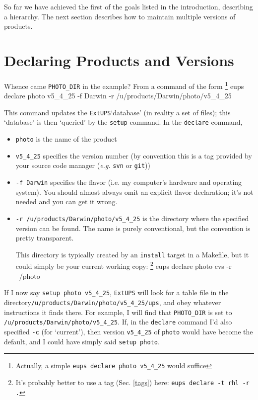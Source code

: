 \documentclass{article}
\newcommand{\code}[1]{\texttt{#1}}
\newcommand{\eups}{\code{ExtUPS}\xspace}
\let\overbatim=\verbatim
\let\oendverbatim=\endverbatim
\renewenvironment{verbatim}
{\center\minipage{16cm}\overbatim}
{\oendverbatim\endminipage\endcenter}
\begin{document}
So far we have achieved the first of the goals listed in the introduction,
describing a hierarchy.   The next section describes how to maintain
multiple versions of products.

\section{Declaring Products and Versions}

Whence came \code{PHOTO\_DIR} in the example? From a command of the form
\footnote{Actually, a simple \code{eups declare photo v5\_4\_25} would suffice}
\begin{verbatim}
eups declare photo v5_4_25 -f Darwin -r /u/products/Darwin/photo/v5_4_25
\end{verbatim}

This command updates the \eups `database' (in reality a set of files);
this `database' is then `queried' by the \code{setup} command. In
the \code{declare} command,
\begin{itemize}
  \item
    \code{photo} is the name of the product

  \item
    \code{v5\_4\_25} specifies the version number (by convention this
    is a tag provided by your source code manager (\textit{e.g.} \code{svn} or \code{git}))

  \item
    \code{-f Darwin} specifies the flavor (i.e. my computer's hardware and
    operating system).  You should almost always omit an explicit flavor declaration;
    it's not needed and you can get it wrong.

  \item
    \code{-r /u/products/Darwin/photo/v5\_4\_25} is the directory where
    the specified version can be found. The name is purely conventional,
    but the convention is pretty transparent.

    This directory is typically created by an \code{install} target
    in a Makefile, but it could simply be your current working
    copy: \footnote{It's probably better to use a tag (Sec. \ref{tags}) here: \code{eups declare -t rhl -r .}}
    \vspace{-7mm}
\begin{verbatim}
       eups declare photo cvs -r ~/photo
\end{verbatim}
\end{itemize}

If I now say \code{setup photo v5\_4\_25}, \eups will look for
a table file in the directory\hfil\break \code{/u/products/Darwin/photo/v5\_4\_25/ups},
and obey whatever instructions it finds there.  For example,
I will find that
\code{PHOTO\_DIR} is set to \code{/u/products/Darwin/photo/v5\_4\_25}. If,
in the \code{declare} command I'd also specified \code{-c} (for
`current'), then version \code{v5\_4\_25} of \code{photo} would
have become the default, and I could have simply said \code{setup photo}.
\end{document}
